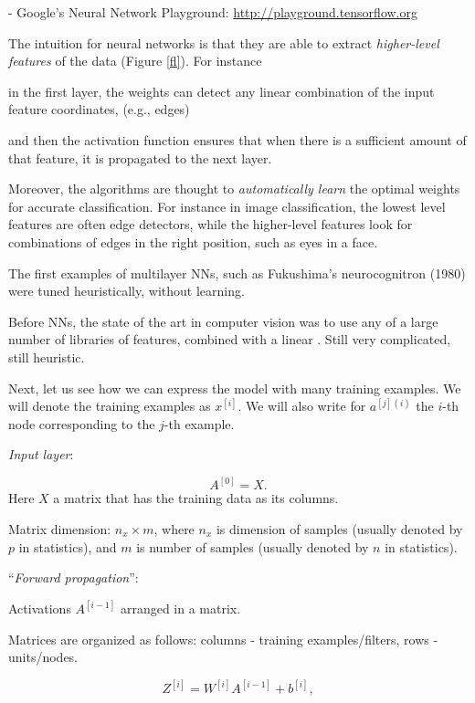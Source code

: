 \documentclass[english]{article}
\begin{document}
- Google's Neural Network Playground: \url{http://playground.tensorflow.org}


\item 
The intuition for neural networks is that they are able to extract \emph{higher-level features} of the data (Figure \ref{fl}). For instance 

\benum 
\item in the first layer, the weights can detect any linear combination of the input feature coordinates, (e.g., edges)
\item and then the activation function ensures that when there is a sufficient amount of that feature, it is propagated to the next layer. 
\eenum 


Moreover, the algorithms are thought to \emph{automatically learn} the optimal weights for accurate classification.  For instance in image classification, the lowest level features are often edge detectors, while the higher-level features look for combinations of edges in the right position, such as eyes in a face. 

The first examples of multilayer NNs, such as Fukushima's neurocognitron (1980) were tuned heuristically, without learning.

Before NNs, the state of the art in computer vision was to use any of a large number of libraries of features, combined with a linear  . Still very complicated, still heuristic.

\item Next, let us see how we can express the model with many training  examples. We will denote the training examples as $x^{[i]}$. We will also write for $a^{[j](i)}$ the $i$-th node corresponding to the $j$-th example. 

\benum 
\item 
\emph{Input layer}:  

$$A^{[0]} = X.$$ 
Here $X$ a matrix that has the training data as its columns. 

Matrix dimension: $n_x \times m$, where $n_x$ is dimension of samples (usually denoted by $p$ in statistics), and $m$ is number of samples (usually denoted by $n$ in statistics).
\item 
``\emph{Forward propagation}'': 

Activations $A^{[i-1]}$ arranged in a matrix. 

Matrices are organized as follows: columns - training examples/filters,  rows - units/nodes. 


$$Z^{[i]} =  W^{[i]}A^{[i-1]}+b^{[i]},$$
\end{document}
